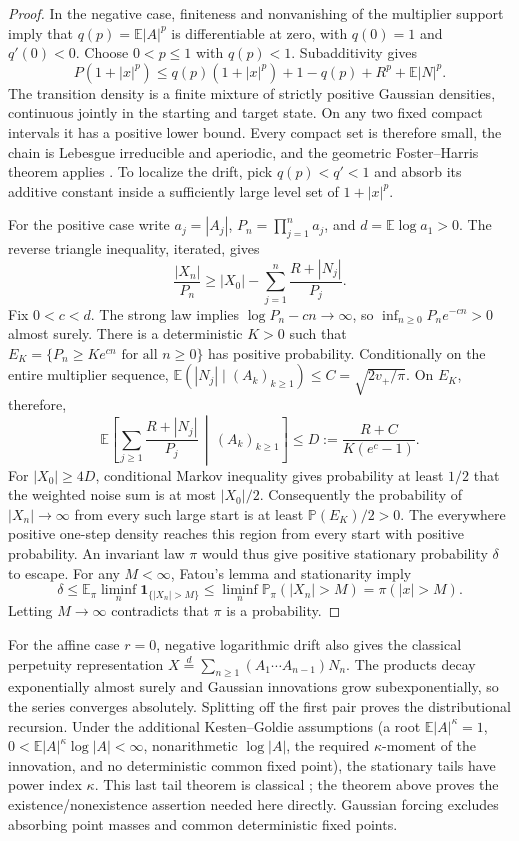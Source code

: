 \begin{proof}
In the negative case, finiteness and nonvanishing of the multiplier
support imply that \(q(p)=\mathbb E|A|^p\) is differentiable at zero,
with \(q(0)=1\) and \(q'(0)<0\). Choose \(0<p\le1\) with \(q(p)<1\).
Subadditivity gives
\[
 P(1+|x|^p)\le q(p)(1+|x|^p)+1-q(p)+R^p+\mathbb E|N|^p.
\]
The transition density is a finite mixture of strictly positive Gaussian
densities, continuous jointly in the starting and target state. On any
two fixed compact intervals it has a positive lower bound. Every compact
set is therefore small, the chain is Lebesgue irreducible and aperiodic,
and the geometric Foster--Harris theorem applies
\citep{hairermattingly2011}. To localize the drift, pick
\(q(p)<q'<1\) and absorb its additive constant inside a sufficiently
large level set of \(1+|x|^p\).

For the positive case write \(a_j=|A_j|\),
\(P_n=\prod_{j=1}^n a_j\), and \(d=\mathbb E\log a_1>0\).
The reverse triangle inequality, iterated, gives
\[
 \frac{|X_n|}{P_n}\ge |X_0|-
 \sum_{j=1}^n\frac{R+|N_j|}{P_j}.
\]
Fix \(0<c<d\). The strong law implies
\(\log P_n-cn\to\infty\), so
\(\inf_{n\ge0}P_ne^{-cn}>0\) almost surely. There is a deterministic
\(K>0\) such that
\(E_K=\{P_n\ge Ke^{cn}\text{ for all }n\ge0\}\) has positive
probability. Conditionally on the entire multiplier sequence,
\(\mathbb E(|N_j|\mid(A_k)_{k\ge1})\le C=\sqrt{2v_+/\pi}\).
On \(E_K\), therefore,
\[
 \mathbb E\!\left[\sum_{j\ge1}\frac{R+|N_j|}{P_j}
       \,\middle|\,(A_k)_{k\ge1}\right]
 \le D:=\frac{R+C}{K(e^c-1)}.
\]
For \(|X_0|\ge4D\), conditional Markov inequality gives probability at
least \(1/2\) that the weighted noise sum is at most \(|X_0|/2\).
Consequently the probability of \(|X_n|\to\infty\) from every such
large start is at least \(\mathbb P(E_K)/2>0\). The everywhere positive
one-step density reaches this region from every start with positive
probability. An invariant law \(\pi\) would thus give positive
stationary probability \(\delta\) to escape. For any \(M<\infty\),
Fatou's lemma and stationarity imply
\[
 \delta\le\mathbb E_\pi\liminf_n\mathbf1_{\{|X_n|>M\}}
 \le\liminf_n\mathbb P_\pi(|X_n|>M)=\pi(|x|>M).
\]
Letting \(M\to\infty\) contradicts that \(\pi\) is a probability.
\end{proof}

For the affine case \(r=0\), negative logarithmic drift also gives the
classical perpetuity representation
\(X\overset d=\sum_{n\ge1}(A_1\cdots A_{n-1})N_n\).
The products decay exponentially almost surely and Gaussian innovations
grow subexponentially, so the series converges absolutely. Splitting off
the first pair proves the distributional recursion. Under the additional
Kesten--Goldie assumptions (a root \(\mathbb E|A|^\kappa=1\),
\(0<\mathbb E|A|^\kappa\log|A|<\infty\), nonarithmetic
\(\log|A|\), the required \(\kappa\)-moment of the innovation, and no
deterministic common fixed point), the stationary tails have power
index \(\kappa\). This last tail theorem is classical
\citep{kesten1973random,goldie1991implicit}; the theorem above proves the
existence/nonexistence assertion needed here directly. Gaussian forcing
excludes absorbing point masses and common deterministic fixed points.

